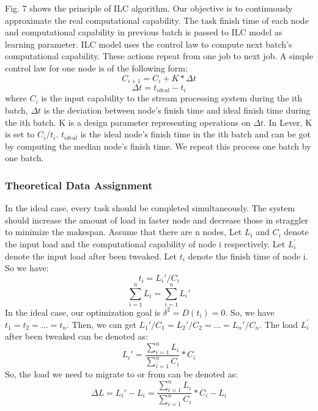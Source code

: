   Fig. 7 shows the principle of ILC algorithm. Our objective is to continuously approximate the real computational capability. The task finish time of each node and computational capability in previous batch is passed to ILC model as learning parameter. ILC model uses the control law to compute next batch's computational capability. These actions repeat from one job to next job. A simple control law for one node is of the following form:
  \begin{equation}
  C_{i+1} = C_i + K*\Delta t
  \end{equation}
   \begin{equation}
  \Delta t = t_{ideal} - t_{i}
  \end{equation}
  where $C_i$ is the input capability to the stream processing system during the ith batch, $\Delta t$ is the deviation between node's finish time and ideal finish time during the ith batch. K is a design parameter representing operations on $\Delta t$. In Lever, K is set to $C_i/t_i$. $t_{ideal}$ is the ideal node's finish time in the ith batch and can be got by computing the median node's finish time. We repeat this process one batch by one batch.

\subsubsection{Theoretical Data Assignment}

  In the ideal case, every task should be completed simultaneously. The system should increase the amount of load in faster node and decrease those in straggler to minimize the makespan. Assume that there are n nodes, Let \emph{$L_i$} and \emph{$C_i$} denote the input load and the computational capability of node i respectively. Let \emph{$L_i^\prime$} denote the input load after been tweaked. Let $t_i$ denote the finish time of node i. So we have:
  \begin{equation}
  t_i = L_i\prime / C_i
  \end{equation}
  \begin{equation}
  \sum_{i=1}^n L_i = \sum_{i=1}^n L_i\prime
  \end{equation}
  In the ideal case, our optimization goal is $\delta^{2}=D(t_i)=0$. So, we have $t_1=t_2=...=t_n$. Then, we can get $L_1\prime/C_1=L_2\prime/C_2=...=L_n\prime/C_n$. The load \emph{$L_i^\prime$} after been tweaked can be denoted as:
  \begin{equation}
  L_i\prime =  \frac{\sum_{i=1}^n L_i}{\sum_{i=1}^n C_i}*C_i
  \end{equation}
  So, the load we need to migrate to or from can be denoted as:
  \begin{equation}
  \Delta L = L_i\prime - L_i = \frac{\sum_{i=1}^n L_i}{\sum_{i=1}^n C_i}*C_i - L_i
  \end{equation}


